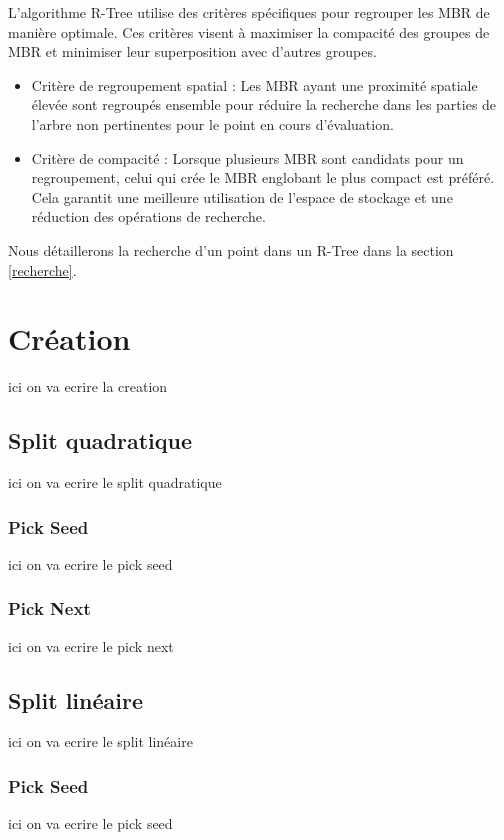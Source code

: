 \documentclass {article}
\begin{document}
L'algorithme R-Tree utilise des critères spécifiques pour regrouper les MBR de manière optimale. 
Ces critères visent à maximiser la compacité des groupes de MBR et minimiser leur superposition avec d'autres groupes.

\begin{itemize}
    \item Critère de regroupement spatial : Les MBR ayant une proximité spatiale élevée sont regroupés ensemble pour réduire la recherche dans les parties de l'arbre non pertinentes pour le point en cours d'évaluation.

    \item Critère de compacité : Lorsque plusieurs MBR sont candidats pour un regroupement, celui qui crée le MBR englobant le plus compact est préféré. Cela garantit une meilleure utilisation de l'espace de stockage et une réduction des opérations de recherche.

\end{itemize}
Nous détaillerons la recherche d'un point dans un R-Tree dans la section \ref{recherche}.

\section {Création}
ici on va ecrire la creation
\subsection {Split quadratique}
ici on va ecrire le split quadratique

\subsubsection {Pick Seed}
ici on va ecrire le pick seed

\subsubsection {Pick Next}
ici on va ecrire le pick next

\subsection {Split linéaire}
ici on va ecrire le split linéaire

\subsubsection {Pick Seed}
ici on va ecrire le pick seed
\end{document}
